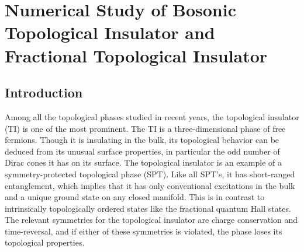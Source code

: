 


\chapter{Numerical Study of Bosonic Topological Insulator and Fractional Topological Insulator}
\label{chapter::SO34D}

\section{Introduction}
Among all the topological phases studied in recent years, the topological insulator (TI) is one of the most prominent.\cite{KaneHasanRMP,QiZhangRMP} The TI is a three-dimensional phase of free fermions. Though it is insulating in the bulk, its topological behavior can be deduced from its unusual surface properties, in particular the odd number of Dirac cones it has on its surface. The topological insulator is an example of a symmetry-protected topological phase (SPT).  Like all SPT's, it has short-ranged entanglement, which implies that it has only conventional excitations in the bulk and a unique ground state on any closed manifold. This is in contrast to intrinsically topologically ordered states like the fractional quantum Hall states. The relevant symmetries for the topological insulator are charge conservation and time-reversal, and if either of these symmetries is violated, the phase loses its topological properties.

